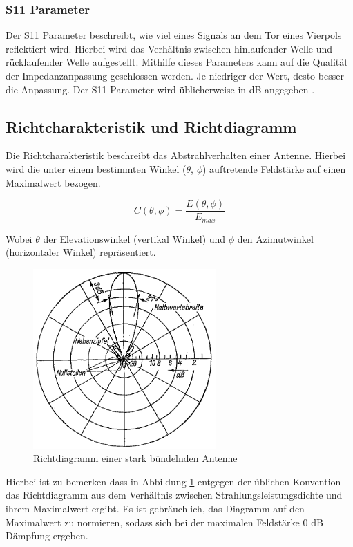 \subsubsection{S11 Parameter}
Der S11 Parameter beschreibt, wie viel eines Signals an dem Tor eines Vierpols reflektiert wird. Hierbei wird das Verhältnis zwischen hinlaufender Welle und rücklaufender Welle aufgestellt. Mithilfe dieses Parameters kann auf die Qualität der Impedanzanpassung geschlossen werden. Je niedriger der Wert, desto besser die Anpassung. Der S11 Parameter wird üblicherweise in dB angegeben \cite{noauthor_streuparameter_2023}.

\subsection{Richtcharakteristik und Richtdiagramm}
Die Richtcharakteristik beschreibt das Abstrahlverhalten einer Antenne. Hierbei wird die unter einem bestimmten Winkel ($\theta$, $\phi$) auftretende Feldstärke auf einen Maximalwert bezogen\cite[p. 20]{Kraus-2002-AntennasB}.

\begin{equation}
	C(\theta, \phi)=\frac{E(\theta, \phi)}{E_{max}}
\end{equation}

Wobei $\theta$ der Elevationswinkel (vertikal Winkel) und $\phi$ den Azimutwinkel (horizontaler Winkel) repräsentiert.

\begin{figure}[H]
	\centering
	\includegraphics[width=7cm]{../ref/Richtdiagramm_Beispiel}
	\caption{Richtdiagramm einer stark bündelnden Antenne \cite{richtdiagramm_beispiel}}
	\label{fig:Richtdiagramm Beispiel}
\end{figure}

Hierbei ist zu bemerken dass in Abbildung \ref{fig:Richtdiagramm Beispiel} entgegen der üblichen Konvention das Richtdiagramm aus dem Verhältnis zwischen Strahlungsleistungsdichte und ihrem Maximalwert ergibt. Es ist gebräuchlich, das Diagramm auf den Maximalwert zu normieren, sodass sich bei der maximalen Feldstärke 0 dB Dämpfung ergeben.\\

